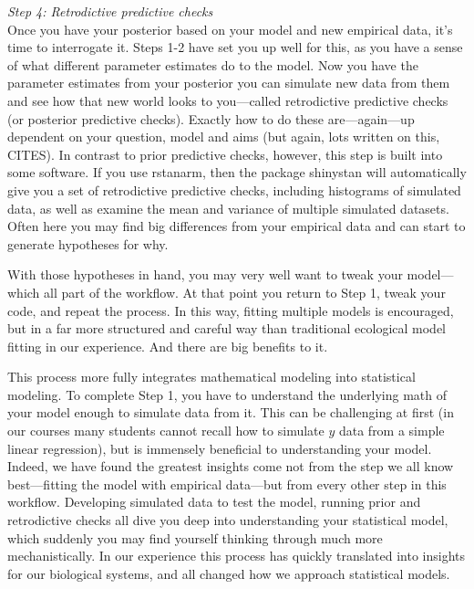 \documentclass[11pt]{article}
\begin{document}
 \emph{Step 4: Retrodictive predictive checks} \\
Once you have your posterior based on your model and new empirical data, it's time to interrogate it. Steps 1-2 have set you up well for this, as you have a sense of what different parameter estimates do to the model. Now you have the parameter estimates from your posterior you can simulate new data from them and see how that new world looks to you---called retrodictive predictive checks (or posterior predictive checks). Exactly how to do these are---again---up dependent on your question, model and aims (but again, lots written on this, CITES). In contrast to prior predictive checks, however, this step is built into some software. If you use \textsf{rstanarm}, then the package \textsf{shinystan} will automatically give you a set of retrodictive predictive checks, including histograms of simulated data, as well as examine the mean and variance of multiple simulated datasets. Often here you may find big differences from your empirical data and can start to generate hypotheses for why.

With those hypotheses in hand, you may very well want to tweak your model---which all part of the workflow. At that point you return to Step 1, tweak your code, and repeat the process. In this way, fitting multiple models is encouraged, but in a far more structured and careful way than traditional ecological model fitting in our experience. And there are big benefits to it. 

This process more fully integrates mathematical modeling into statistical modeling. To complete Step 1, you have to understand the underlying math of your model enough to simulate data from it. This can be challenging at first (\eg in our courses many students cannot recall how to simulate $y$ data from a simple linear regression), but is immensely beneficial to understanding your model. Indeed, we have found the greatest insights come not from the step we all know best---fitting the model with empirical data---but from every other step in this workflow. Developing simulated data to test the model, running prior and retrodictive checks all dive you deep into understanding your statistical model, which suddenly you may find yourself thinking through much more mechanistically. In our experience this process has quickly translated into insights for our biological systems, and all changed how we approach statistical models. 
\end{document}
